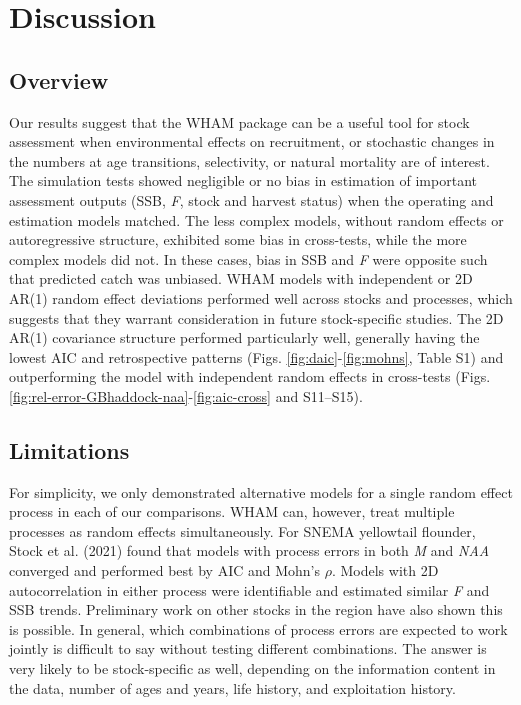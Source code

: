 \documentclass[]{article}
\begin{document}
\hypertarget{discussion}{%
\section{Discussion}\label{discussion}}

\hypertarget{overview}{%
\subsection{Overview}\label{overview}}

Our results suggest that the WHAM package can be a useful tool for stock
assessment when environmental effects on recruitment, or stochastic
changes in the numbers at age transitions, selectivity, or natural
mortality are of interest. The simulation tests showed negligible or no
bias in estimation of important assessment outputs (SSB, \emph{F}, stock
and harvest status) when the operating and estimation models matched.
The less complex models, without random effects or autoregressive
structure, exhibited some bias in cross-tests, while the more complex
models did not. In these cases, bias in SSB and \emph{F} were opposite
such that predicted catch was unbiased. WHAM models with independent or
2D AR(1) random effect deviations performed well across stocks and
processes, which suggests that they warrant consideration in future
stock-specific studies. The 2D AR(1) covariance structure performed
particularly well, generally having the lowest AIC and retrospective
patterns (Figs. \ref{fig:daic}-\ref{fig:mohns}, Table S1) and
outperforming the model with independent random effects in cross-tests
(Figs. \ref{fig:rel-error-GBhaddock-naa}-\ref{fig:aic-cross} and
S11--S15).

\hypertarget{limitations}{%
\subsection{Limitations}\label{limitations}}

For simplicity, we only demonstrated alternative models for a single
random effect process in each of our comparisons. WHAM can, however,
treat multiple processes as random effects simultaneously. For SNEMA
yellowtail flounder, Stock et al. (2021) found that models with process
errors in both \emph{M} and \emph{NAA} converged and performed best by
AIC and Mohn's \(\rho\). Models with 2D autocorrelation in either
process were identifiable and estimated similar \emph{F} and SSB trends.
Preliminary work on other stocks in the region have also shown this is
possible. In general, which combinations of process errors are expected
to work jointly is difficult to say without testing different
combinations. The answer is very likely to be stock-specific as well,
depending on the information content in the data, number of ages and
years, life history, and exploitation history.
\end{document}
